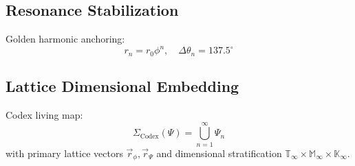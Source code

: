 \subsection*{Resonance Stabilization}
Golden harmonic anchoring:
\begin{equation}
r_n = r_0 \phi^n, \quad \Delta \theta_n = 137.5^\circ
\end{equation}

\subsection*{Lattice Dimensional Embedding}
Codex living map:
\begin{equation}
\Sigma_{\text{Codex}}(\Psi) = \bigcup_{n=1}^{\infty} \Psi_n
\end{equation}
with primary lattice vectors \(\vec{r}_\phi, \vec{r}_\Psi\) and dimensional stratification \(\mathbb{T}_\infty \times \mathbb{M}_\infty \times \mathbb{K}_\infty\).

